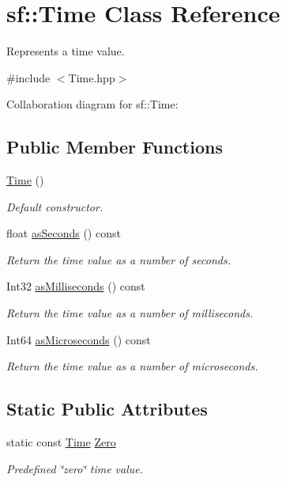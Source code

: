 \hypertarget{classsf_1_1_time}{}\section{sf\+:\+:Time Class Reference}
\label{classsf_1_1_time}


Represents a time value.  




{\ttfamily \#include $<$Time.\+hpp$>$}



Collaboration diagram for sf\+:\+:Time\+:
\subsection*{Public Member Functions}
\begin{DoxyCompactItemize}
\item 
\hyperlink{classsf_1_1_time_acba0cfbc49e3a09a22a8e079eb67a05c}{Time} ()
\begin{DoxyCompactList}\small\item\em Default constructor. \end{DoxyCompactList}\item 
float \hyperlink{classsf_1_1_time_aa3df2f992d0b0041b4eb02258d43f0e3}{as\+Seconds} () const
\begin{DoxyCompactList}\small\item\em Return the time value as a number of seconds. \end{DoxyCompactList}\item 
Int32 \hyperlink{classsf_1_1_time_aa16858ca030a07eb18958c321f256e5a}{as\+Milliseconds} () const
\begin{DoxyCompactList}\small\item\em Return the time value as a number of milliseconds. \end{DoxyCompactList}\item 
Int64 \hyperlink{classsf_1_1_time_a000c2c64b74658ebd228b9294a464275}{as\+Microseconds} () const
\begin{DoxyCompactList}\small\item\em Return the time value as a number of microseconds. \end{DoxyCompactList}\end{DoxyCompactItemize}
\subsection*{Static Public Attributes}
\begin{DoxyCompactItemize}
\item 
\mbox{\label{classsf_1_1_time_a8db127b632fa8da21550e7282af11fa0}} 
static const \hyperlink{classsf_1_1_time}{Time} \hyperlink{classsf_1_1_time_a8db127b632fa8da21550e7282af11fa0}{Zero}
\begin{DoxyCompactList}\small\item\em Predefined \char`\"{}zero\char`\"{} time value. \end{DoxyCompactList}\end{DoxyCompactItemize}
